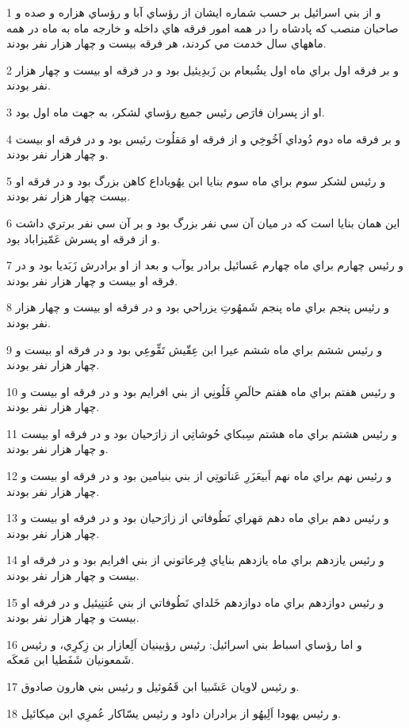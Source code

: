\par 1 و از بني اسرائيل بر حسب شماره ايشان از رؤساي آبا و رؤساي هزاره و صده و صاحبان منصب که پادشاه را در همه امور فرقه هاي داخله و خارجه ماه به ماه در همه ماههاي سال خدمت مي کردند، هر فرقه بيست و چهار هزار نفر بودند.
\par 2 و بر فرقه اول براي ماه اول يشُبعام بن زَبدِيئيل بود و در فرقه او بيست و چهار هزار نفر بودند.
\par 3 او از پسران فارَص رئيس جميع رؤساي لشکر، به جهت ماه اول بود.
\par 4 و بر فرقه ماه دوم دُوداي اَخُوخِي و از فرقه او مَقلُوت رئيس بود و در فرقه او بيست و چهار هزار نفر بودند.
\par 5 و رئيس لشکر سوم براي ماه سوم بنايا ابن يهُوياداع کاهن بزرگ بود و در فرقه او بيست چهار هزار نفر بودند.
\par 6 اين همان بنايا است که در ميان آن سي نفر بزرگ بود و بر آن سي نفر برتري داشت و از فرقه او پسرش عَمّيزاباد بود.
\par 7 و رئيس چهارم براي ماه چهارم عَسائيل برادر يوآب و بعد از او برادرش زَبَديا بود و در فرقه او بيست و چهار هزار نفر بودند.
\par 8 و رئيس پنجم براي ماه پنجم شَمهُوتِ يزراحي بود و در فرقه او بيست و چهار هزار نفر بودند.
\par 9 و رئيس ششم براي ماه ششم عيرا ابن عِقّيش تَقِّوعِي بود و در فرقه او بيست و چهار هزار نفر بودند.
\par 10 و رئيس هفتم براي ماه هفتم حالَصِ فَلُونِي از بني افرايم بود و در فرقه او بيست و چهار هزار نفر بودند.
\par 11 و رئيس هشتم براي ماه هشتم سِبکاي حُوشاتِي از زارَحيان بود و در فرقه او بيست و چهار هزار نفر بودند.
\par 12 و رئيس نهم براي ماه نهم اَبيعَزَرِ عَناتوتِي از بني بنيامين بود و در فرقه او بيست و چهار هزار نفر بودند.
\par 13 و رئيس دهم براي ماه دهم مَهراي نَطُوفاتي از زارَحيان بود و در فرقه او بيست و چهار هزار نفر بودند.
\par 14 و رئيس يازدهم براي ماه يازدهم بناياي فِرعاتوني از بني افرايم بود و در فرقه او بيست و چهار هزار نفر بودند.
\par 15 و رئيس دوازدهم براي ماه دوازدهم خَلداي نَطُوفاتي از بني عُتنِيئيل و در فرقه او بيست و چهار هزار نفر بودند.
\par 16 و اما رؤساي اسباط بني اسرائيل: رئيس رؤبينيان اَلِعازار بن زِکرِي، و رئيس شَمعونيان شَفَطيا ابن مَعکَه.
\par 17 و رئيس لاويان عَشَبيا ابن قَمُوئيل و رئيس بني هارون صادوق.
\par 18 و رئيس يهودا اَلِيهُو از برادران داود و رئيس يسّاکار عُمرِي ابن ميکائيل.
